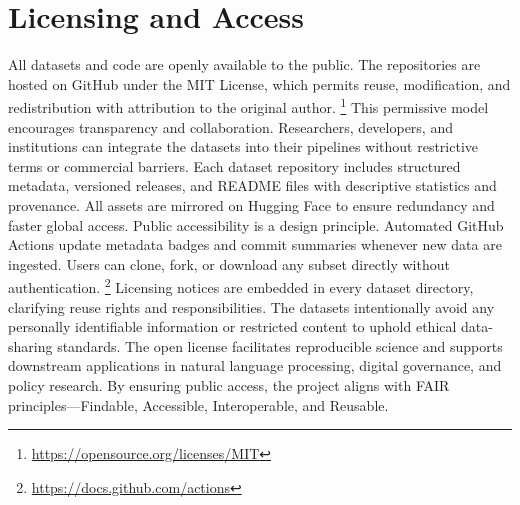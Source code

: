 \documentclass[10pt,a4paper]{article}%
\begin{document}
\section{Licensing and Access}%
\label{sec:LicensingandAccess}%
All datasets and code are openly available to the public. The repositories are hosted on GitHub under the MIT License, which permits reuse, modification, and redistribution with attribution to the original author.%
\footnote{\href{https://opensource.org/licenses/MIT}{https://opensource.org/licenses/MIT}}%
\newline%
\newline%
This permissive model encourages transparency and collaboration. Researchers, developers, and institutions can integrate the datasets into their pipelines without restrictive terms or commercial barriers.%
\citep{OpenDataPractices2020}%
\newline%
\newline%
Each dataset repository includes structured metadata, versioned releases, and README files with descriptive statistics and provenance. All assets are mirrored on Hugging Face to ensure redundancy and faster global access.%
\citep{HuggingFaceDatasets2021}%
\newline%
\newline%
Public accessibility is a design principle. Automated GitHub Actions update metadata badges and commit summaries whenever new data are ingested. Users can clone, fork, or download any subset directly without authentication.%
\footnote{\href{https://docs.github.com/actions}{https://docs.github.com/actions}}%
\newline%
\newline%
Licensing notices are embedded in every dataset directory, clarifying reuse rights and responsibilities. The datasets intentionally avoid any personally identifiable information or restricted content to uphold ethical data-sharing standards.%
\citep{EthicalOpenData2019}%
\newline%
\newline%
The open license facilitates reproducible science and supports downstream applications in natural language processing, digital governance, and policy research. By ensuring public access, the project aligns with FAIR principles—Findable, Accessible, Interoperable, and Reusable.%
\citep{FAIRPrinciples2016}%
\newline%
\newline

%
\end{document}
